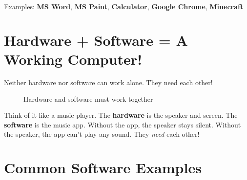 Examples: \textbf{MS Word}, \textbf{MS Paint}, \textbf{Calculator}, \textbf{Google Chrome}, \textbf{Minecraft}

\section{Hardware + Software = A Working Computer!}
\label{sec:hw-plus-sw}

Neither hardware nor software can work alone. They need each other!

\begin{figure}[H]
\centering
{}
\caption{Hardware and software must work together}
\label{fig:hw-plus-sw}
\end{figure}

\begin{realworld}
Think of it like a music player. The \textbf{hardware} is the speaker and screen. The \textbf{software} is the music app. Without the app, the speaker stays silent. Without the speaker, the app can't play any sound. They \emph{need} each other!
\end{realworld}

\section{Common Software Examples}
\label{sec:common-software}

